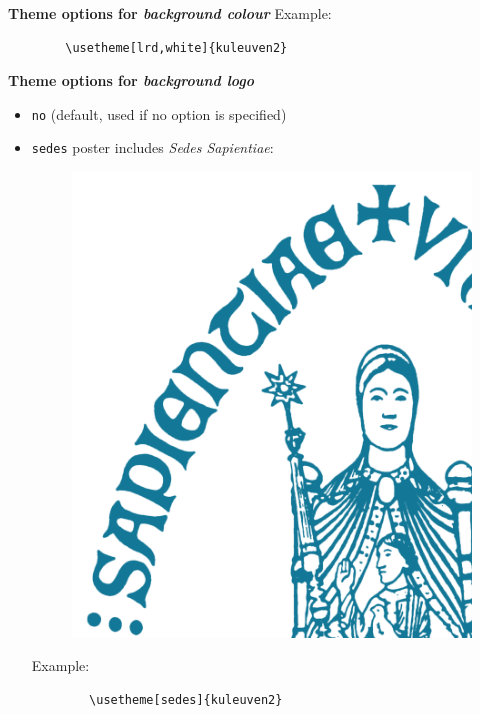 \documentclass{beamer}
\begin{document}
\begin{frame}[t,fragile]
\begin{columns}[T,totalwidth=\textwidth]
\begin{column}{.48\textwidth}
\begin{block}{\bfseries Theme options for \emph{background colour}}
		\vspace{24pt}
		Example:
		\begin{verbatim}
		\usetheme[lrd,white]{kuleuven2}
		\end{verbatim}
	\end{block}
	
	
\vspace{24pt}
	\begin{block}{\bfseries Theme options for \emph{background logo}}
	\begin{itemize}
		\item \texttt{no} \quad (default, used if no option is specified) 
		\item \texttt{sedes} \qquad poster includes \textit{Sedes Sapientiae}:
	
		\begin{figure}
		\flushright
		\includegraphics[height=.1\paperheight]{graphics/sedes.png} 
		\end{figure} 

		\vspace{-100pt}
		Example:
		\begin{verbatim}
		\usetheme[sedes]{kuleuven2}
		\end{verbatim}
	\end{itemize}
	\end{block}
	

\end{column}
\end{columns}
\end{frame}
\end{document}
